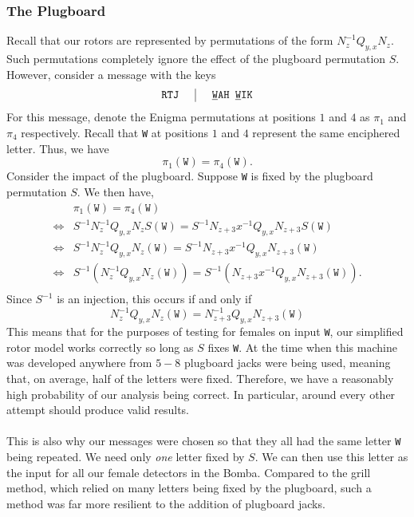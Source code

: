 \subsubsection{The Plugboard}
Recall that our rotors are represented by permutations of the form
$N_{z}^{-1}Q_{y,x}N_{z}$. Such permutations completely ignore the
effect of the plugboard permutation $S$. However, consider a message
with the keys
\[
  \setlength{\arraycolsep}{15pt}
  \begin{array}{c | c}
    \texttt{RTJ} & {\uline{\texttt{W}}}\texttt{AH
    }{\uline{\texttt{W}}}\texttt{IK}              \\
  \end{array}
\]
For this message, denote the Enigma permutations at positions $1$ and
$4$ as $\pi_1$ and $\pi_4$ respectively. Recall that \texttt{W}
at positions $1$ and $4$ represent the same enciphered letter. Thus, we have
\[
  \pi_1(\texttt{W}) = \pi_4(\texttt{W}).
\]
Consider the impact of the plugboard. Suppose \texttt{W} is fixed by
the plugboard permutation $S$. We then have,
\begin{align*}
  & \pi_1(\texttt{W}) = \pi_4(\texttt{W})
  \\
  \iff & S^{-1}N_z^{-1}Q_{y,x}N_zS(\texttt{W}) =
  S^{-1}N_{z+3}x^{-1}Q_{y,x}N_{z+3}S(\texttt{W})     \\
  \iff & S^{-1}N_z^{-1}Q_{y,x}N_z(\texttt{W}) =
  S^{-1}N_{z+3}x^{-1}Q_{y,x}N_{z+3}(\texttt{W})      \\
  \iff & S^{-1}(N_z^{-1}Q_{y,x}N_z(\texttt{W})) =
  S^{-1}(N_{z+3}x^{-1}Q_{y,x}N_{z+3}(\texttt{W})).    \\
\end{align*}
Since $S^{-1}$ is an injection, this occurs if and only if
\[
  N_z^{-1}Q_{y,x}N_z(\texttt{W}) = N_{z+3}^{-1}Q_{y,x}N_{z+3}(\texttt{W})
\]
This means that for the purposes of testing for females on input
\texttt{W}, our simplified rotor model works correctly so long as $S$
fixes \texttt{W}. At the time when this machine was developed
anywhere from $5-8$ plugboard jacks were being used, meaning that, on
average, half of the letters were fixed. Therefore, we have a
reasonably high probability of our analysis being correct. In
particular, around every other attempt should produce valid results.
\\\\This is also why our messages were chosen so that
they all had the same letter \texttt{W} being repeated. We need only
\emph{one} letter fixed by $S$. We can then use this letter as the
input for all our female detectors in the Bomba. Compared to the
grill method, which relied on many letters being fixed by the
plugboard, such a method was far more resilient to the addition of
plugboard jacks.

